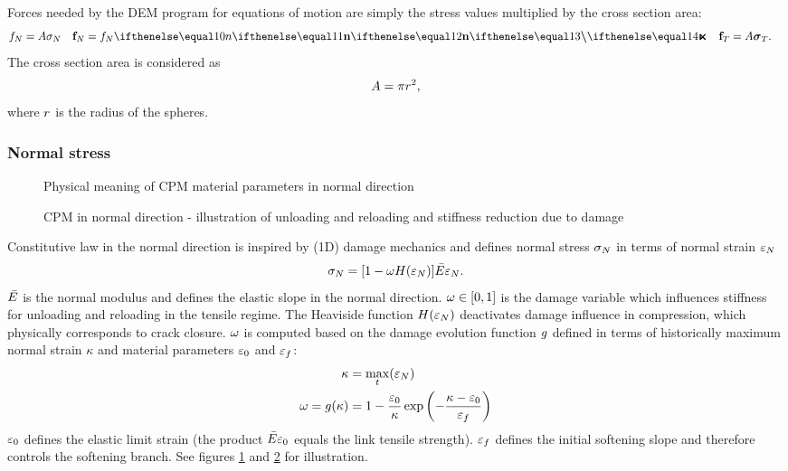 Forces needed by the DEM program for equations of motion are simply the stress values multiplied by the cross section area:
\begin{align}
	\force_\normalComponent &= \linkCrossSectionArea\linkStressNormal
	&
	\forceVector_\normalComponent &= \force_\normalComponent\normalVector
	&
	\forceVector_\shearComponent &= \linkCrossSectionArea\linkStressShearVector
	.
\end{align}
The cross section area is considered as
\begin{equation}
	A = \pi r^2
	,
\end{equation}
where $r$ is the radius of the spheres.


\subsubsection{Normal stress}

\begin{figure}[htb]
	\centering
	\caption{Physical meaning of CPM material parameters in normal direction}
	\label{figCpmStressStrainNormal}
\end{figure}

\begin{figure}[hbt]
	\centering
	\caption[CPM in normal direction]{CPM in normal direction - illustration of unloading and reloading and stiffness reduction due to damage}
	\label{figCpmStressStrainNormalCyclic}
\end{figure}

Constitutive law in the normal direction is inspired by (1D) damage mechanics and
defines normal stress $\sigma_N$ in terms of normal strain $\varepsilon_N$
\begin{align}
	\linkStressNormal = [1-\damage H(\linkStrainNormal)]\linkMaterialStiffnessNormal\linkStrainNormal
	.
\end{align}
$\linkMaterialStiffnessNormal$ is the normal modulus and defines the elastic slope in the normal direction.
$\omega\in[0,1]$ is the damage variable which influences stiffness for unloading and reloading in the tensile regime.
The Heaviside function $H(\varepsilon_N)$ deactivates damage influence in compression, which physically corresponds to
crack closure.
$\omega$ is computed based on the damage evolution function $g$ defined in terms of historically maximum normal strain $\kappa$ and material parameters $\varepsilon_0$ and $\varepsilon_f$:
\begin{align}
	\kappa &= \max_t(\varepsilon_N)
	\\
	\omega = g(\kappa) &= 1-\frac{\varepsilon_0}{\kappa}\exp\left(-\frac{\kappa-\varepsilon_0}{\varepsilon_f}\right)
\end{align}
$\varepsilon_0$ defines the elastic limit strain (the product $\linkMaterialStiffnessNormal\strainO$ equals the link tensile strength).
$\varepsilon_f$ defines the initial softening slope and therefore controls the softening branch.
See figures \ref{figCpmStressStrainNormal} and \ref{figCpmStressStrainNormalCyclic} for illustration.




